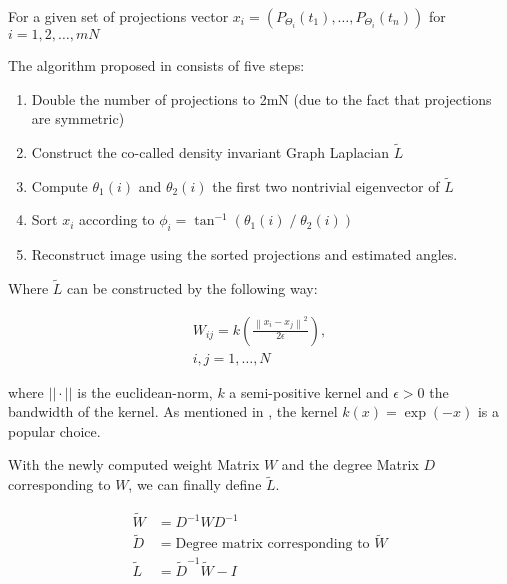 For a given set of projections vector $x_i = ( P_{\Theta_i}(t_1), \dots, P_{\Theta_i}(t_n))$ for $i = 1,2, \dots, mN$

The algorithm proposed in \cite{LaplaceRandomProjections} consists of five steps:

\begin{enumerate}
    \item Double the number of projections to 2mN (due to the fact that projections are symmetric)
    \item Construct the co-called density invariant Graph Laplacian $\tilde{L}$
    \item Compute $\theta_1(i)$ and $\theta_2(i)$ the first two nontrivial eigenvector of $\tilde{L}$
    \item Sort $x_i$ according to $\phi_i = \tan^{-1}(\theta_1(i) \; / \;\theta_2(i))$
    \item Reconstruct image using the sorted projections and estimated angles.
\end{enumerate}

Where $\tilde{L}$ can be constructed by the following way:

\begin{equation}
    \begin{aligned}
        W_{ij} = k \left ( \frac{\left \| x_i - x_j \right \|^2}{2 \epsilon}  \right ), \\
        i, j = 1, \dots, N
    \end{aligned}
\end{equation}

where $||\cdot ||$ is the euclidean-norm, $k$ a semi-positive kernel 
and  $\epsilon > 0$ the bandwidth of the kernel. As mentioned in \cite{LaplaceRandomProjections},
the kernel $k(x) = \exp (-x)$ is a popular choice.

With the newly computed weight Matrix $W$ and the degree Matrix $D$ corresponding to $W$, we can finally 
define $\tilde{L}$.

\begin{equation}
    \begin{aligned}
        \tilde{W} &= D^{-1} W D^{-1} \\
        \tilde{D} &= \text{Degree matrix corresponding to } \tilde{W} \\
        \tilde{L} &= \tilde{D}^{-1} \tilde{W} - I \\
    \end{aligned}
\end{equation}

